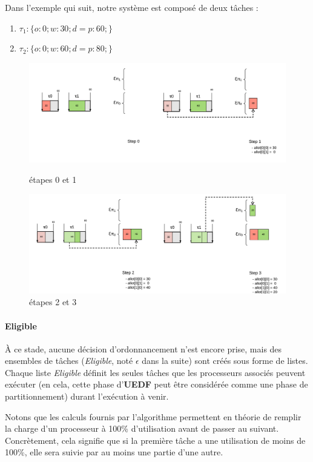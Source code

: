	Dans l'exemple qui suit, notre système est composé de deux tâches :
	\begin{enumerate}
		\item $\tau_1 : \{o:0; w:30; d=p:60;\}$
		\item $\tau_2 : \{o:0; w:60; d=p:80;\}$
	\end{enumerate}
	\begin{figure}[H]
		\includegraphics[scale=1]{img/uedf/uedf12}
		\caption{étapes 0 et 1}
		\includegraphics[scale=1]{img/uedf/uedf34}
		\caption{étapes 2 et 3}
	\end{figure}
	\paragraph{Eligible}
	À ce stade, aucune décision d'ordonnancement n'est encore prise, mais des ensembles de tâches (\textit{Eligible}, 
	noté $\epsilon$ dans la suite) sont créés sous forme de listes. Chaque liste \textit{Eligible} définit 
	les seules tâches que les processeurs associés peuvent exécuter (en cela, cette phase d'\textbf{UEDF} peut 
	être considérée comme une phase de partitionnement) durant l'exécution à venir.\newline
	
	Notons que les calculs fournis par l'algorithme permettent en théorie de \og{}remplir\fg{} 
	la charge d'un processeur à 100\% d'utilisation avant de passer au suivant. Concrètement, 
	cela signifie que si la première tâche a une utilisation de moins de 100\%, elle sera suivie par 
	au moins une partie d'une autre.\newline
	
